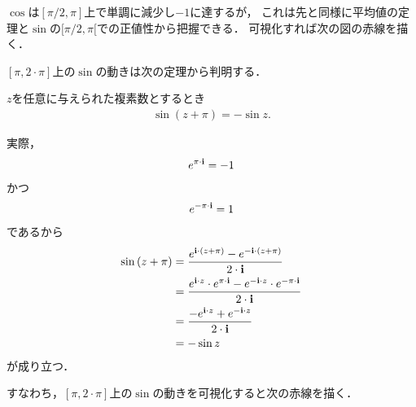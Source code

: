 	$\cos$は$[\pi/2,\pi]$上で単調に減少し$-1$に達するが，
	これは先と同様に平均値の定理と$\sin$の$[\pi/2,\pi[$での正値性から把握できる．
	可視化すれば次の図の赤線を描く．
	
	\begin{center}
	\end{center}
	
	$[\pi,2 \cdot \pi]$上の$\sin$の動きは次の定理から判明する．
	\begin{screen}
		\begin{thm}
			$z$を任意に与えられた複素数とするとき
			\begin{align}
				\sin{(z + \pi)} = -\sin{z}.
			\end{align}
		\end{thm}
	\end{screen}
	
	\begin{sketch}
		実際，
		\begin{align}
			e^{\pi \cdot \mathbf{i}} = -1
		\end{align}
		かつ
		\begin{align}
			e^{-\pi \cdot \mathbf{i}} = 1
		\end{align}
		であるから
		\begin{align}
			\sin{(z + \pi)}
			&= \frac{e^{\mathbf{i} \cdot (z + \pi)} - e^{-\mathbf{i} \cdot (z + \pi)}}{2 \cdot \mathbf{i}} \\
			&= \frac{e^{\mathbf{i} \cdot z} \cdot e^{\pi \cdot \mathbf{i}} - e^{-\mathbf{i} \cdot z} \cdot e^{-\pi \cdot \mathbf{i}}}{2 \cdot \mathbf{i}} \\
			&= \frac{-e^{\mathbf{i} \cdot z} + e^{-\mathbf{i} \cdot z}}{2 \cdot \mathbf{i}} \\
			&= -\sin{z}
		\end{align}
		が成り立つ．
		\QED
	\end{sketch}
	
	すなわち，$[\pi,2 \cdot \pi]$上の$\sin$の動きを可視化すると次の赤線を描く．
	
